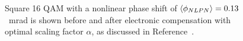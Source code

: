\begin{figure}[H]
  \centering
  \qquad
  \caption{Square 16 QAM with a  nonlinear phase shift of $\braket{\phi_{NLPN}}= 0.13$~mrad is shown before and after electronic compensation with optimal scaling factor $\alpha$, as discussed in Reference~\cite{NLPNDSP}.}                                                                                                                                                                                                                                                                                                                                                                                                                                                                                                                                                                                                                                                                                                                                                                                                                                                                                                                                                                                                                                                                                                                                                                                                                                                                                                                                                                                                                                                                                                                                                                                                                                                                                                                                                                                                                                                                                                                                                                                                                                                                                                                                                                                                                                                                                                                                                                                                                                                                                                                                                                                                                                                                                                                                                                                                                                                                                                      
\end{figure}

